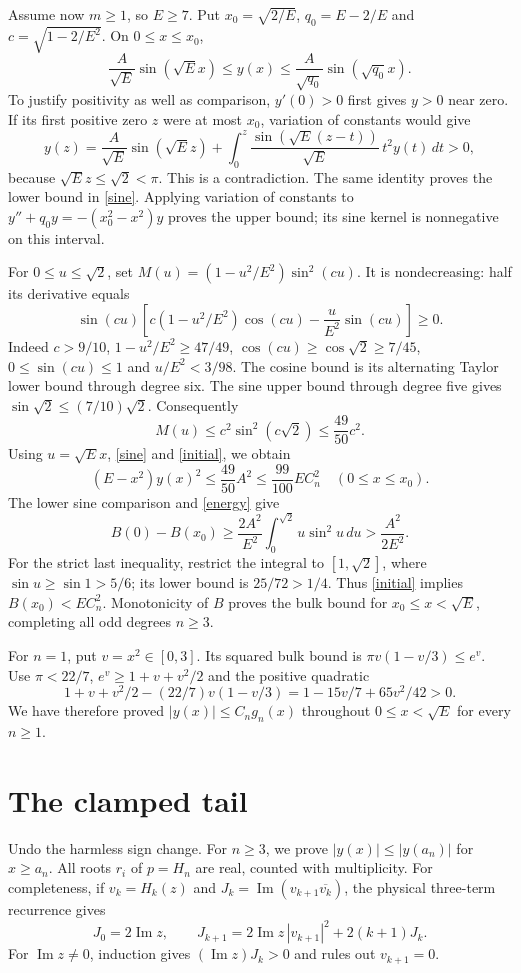 \documentclass[11pt]{article}
\begin{document}
Assume now $m\geq1$, so $E\geq7$. Put $x_0=\sqrt{2/E}$, $q_0=E-2/E$ and $c=\sqrt{1-2/E^2}$. On $0\leq x\leq x_0$,
\begin{equation}\label{sine}
 \frac A{\sqrt E}\sin(\sqrt E x)\leq y(x)\leq
 \frac A{\sqrt{q_0}}\sin(\sqrt{q_0}x).
\end{equation}
To justify positivity as well as comparison, $y'(0)>0$ first gives $y>0$ near zero. If its first positive zero $z$ were at most $x_0$, variation of constants would give
\[
 y(z)=\frac A{\sqrt E}\sin(\sqrt E z)+
 \int_0^z\frac{\sin(\sqrt E(z-t))}{\sqrt E}\,t^2y(t)\,dt>0,
\]
because $\sqrt E z\leq\sqrt2<\pi$. This is a contradiction. The same identity proves the lower bound in \eqref{sine}. Applying variation of constants to $y''+q_0y=-(x_0^2-x^2)y$ proves the upper bound; its sine kernel is nonnegative on this interval.

For $0\leq u\leq\sqrt2$, set $M(u)=(1-u^2/E^2)\sin^2(cu)$. It is nondecreasing: half its derivative equals
\[
 \sin(cu)\left[c(1-u^2/E^2)\cos(cu)-\frac u{E^2}\sin(cu)\right]\geq0.
\]
Indeed $c>9/10$, $1-u^2/E^2\geq47/49$, $\cos(cu)\geq\cos\sqrt2\geq7/45$, $0\leq\sin(cu)\leq1$ and $u/E^2<3/98$. The cosine bound is its alternating Taylor lower bound through degree six. The sine upper bound through degree five gives $\sin\sqrt2\leq(7/10)\sqrt2$. Consequently
\[
 M(u)\leq c^2\sin^2(c\sqrt2)\leq\frac{49}{50}c^2.
\]
Using $u=\sqrt E x$, \eqref{sine} and \eqref{initial}, we obtain
\begin{equation}\label{small}
 (E-x^2)y(x)^2\leq\frac{49}{50}A^2\leq\frac{99}{100}EC_n^2
 \quad(0\leq x\leq x_0).
\end{equation}
The lower sine comparison and \eqref{energy} give
\[
 B(0)-B(x_0)\geq\frac{2A^2}{E^2}\int_0^{\sqrt2}u\sin^2u\,du
 >\frac{A^2}{2E^2}.
\]
For the strict last inequality, restrict the integral to $[1,\sqrt2]$, where $\sin u\geq\sin1>5/6$; its lower bound is $25/72>1/4$. Thus \eqref{initial} implies $B(x_0)<EC_n^2$. Monotonicity of $B$ proves the bulk bound for $x_0\leq x<\sqrt E$, completing all odd degrees $n\geq3$.

For $n=1$, put $v=x^2\in[0,3]$. Its squared bulk bound is
$\pi v(1-v/3)\leq e^v$. Use $\pi<22/7$, $e^v\geq1+v+v^2/2$ and the positive quadratic
\[
 1+v+v^2/2-(22/7)v(1-v/3)=1-15v/7+65v^2/42>0.
\]
We have therefore proved $|y(x)|\leq C_ng_n(x)$ throughout $0\leq x<\sqrt E$ for every $n\geq1$.

\section*{The clamped tail}
Undo the harmless sign change. For $n\geq3$, we prove $|y(x)|\leq|y(a_n)|$ for $x\geq a_n$. All roots $r_i$ of $p=H_n$ are real, counted with multiplicity. For completeness, if $v_k=H_k(z)$ and $J_k=\operatorname{Im}(v_{k+1}\overline{v_k})$, the physical three-term recurrence gives
\[
 J_0=2\operatorname{Im}z,\qquad
 J_{k+1}=2\operatorname{Im}z\,|v_{k+1}|^2+2(k+1)J_k.
\]
For $\operatorname{Im}z\ne0$, induction gives $(\operatorname{Im}z)J_k>0$ and rules out $v_{k+1}=0$.
\end{document}
